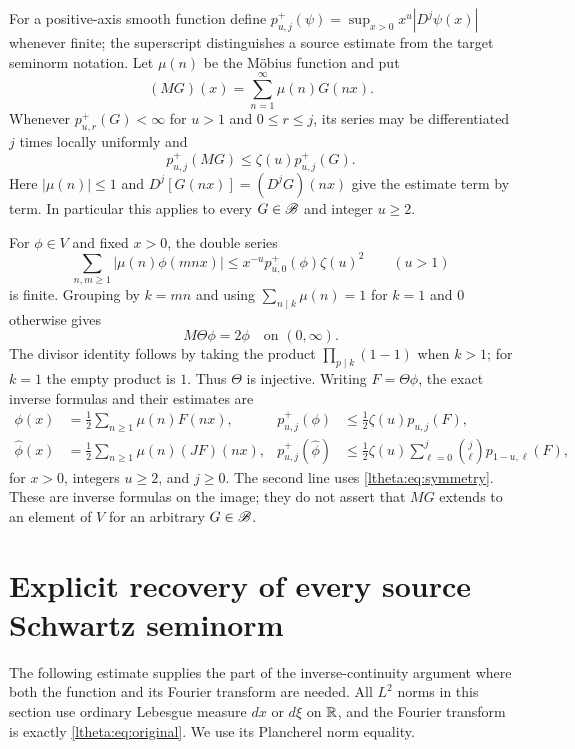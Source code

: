 For a positive-axis smooth function define
$p^+_{u,j}(\psi)=\sup_{x>0}x^u|D^j\psi(x)|$ whenever finite;
the superscript distinguishes a source estimate from the target
seminorm notation. Let $\mu(n)$ be the M\"obius function and put
\[
 (MG)(x)=\sum_{n=1}^{\infty}\mu(n)G(nx).
\]
Whenever $p^+_{u,r}(G)<\infty$ for $u>1$ and $0\leq r\leq j$, its
series may be differentiated $j$ times locally uniformly and
\begin{equation}\label{ltheta:eq:mobius-bound}
 p^+_{u,j}(MG)\leq\zeta(u)p^+_{u,j}(G).
\end{equation}
Here $|\mu(n)|\leq1$ and $D^j[G(nx)]=(D^jG)(nx)$ give the estimate
term by term. In particular this applies to every $G\in\mathscr B$ and
integer $u\geq2$.

For $\phi\in V$ and fixed $x>0$, the double series
\[
 \sum_{n,m\geq1}|\mu(n)\phi(mnx)|
 \leq x^{-u}p^+_{u,0}(\phi)\zeta(u)^2
 \qquad(u>1)
\]
is finite. Grouping by $k=mn$ and using
$\sum_{n\mid k}\mu(n)=1$ for $k=1$ and $0$ otherwise gives
\begin{equation}\label{ltheta:eq:mobius-inversion}
 M\Theta\phi=2\phi\quad\text{on }(0,\infty).
\end{equation}
The divisor identity follows by taking the product
$\prod_{p\mid k}(1-1)$ when $k>1$; for $k=1$ the empty product is $1$.
Thus $\Theta$ is injective. Writing $F=\Theta\phi$, the exact inverse
formulas and their estimates are
\begin{align}
 \phi(x)&=\tfrac12\sum_{n\geq1}\mu(n)F(nx),&
 p^+_{u,j}(\phi)&\leq\tfrac12\zeta(u)p_{u,j}(F),
       \label{ltheta:eq:inverse-phi}\\
 \widehat\phi(x)&=\tfrac12\sum_{n\geq1}\mu(n)(JF)(nx),&
 p^+_{u,j}(\widehat\phi)&\leq\tfrac12\zeta(u)
                    \sum_{\ell=0}^j\binom j\ell p_{1-u,\ell}(F),
       \label{ltheta:eq:inverse-hat}
\end{align}
for $x>0$, integers $u\geq2$, and $j\geq0$. The second line uses
\eqref{ltheta:eq:symmetry}. These are inverse formulas on the image; they
do not assert that $MG$ extends to an element of $V$ for an arbitrary
$G\in\mathscr B$.

\section{Explicit recovery of every source Schwartz seminorm}

The following estimate supplies the part of the inverse-continuity
argument where both the function and its Fourier transform are needed.
All $L^2$ norms in this section use ordinary Lebesgue measure $dx$ or
$d\xi$ on $\mathbb R$, and the Fourier transform is exactly
\eqref{ltheta:eq:original}. We use its Plancherel norm equality.

